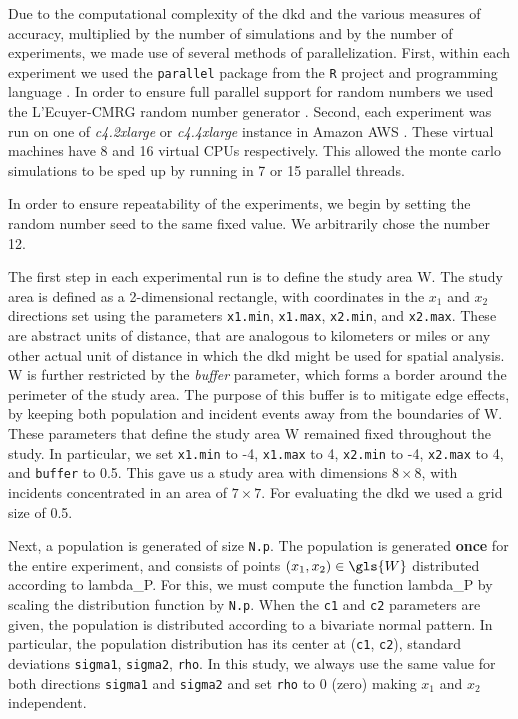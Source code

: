 Due to the computational complexity of the \gls{dkd} and the various measures of accuracy,
multiplied by the number of simulations and by the number of experiments,
we made use of several methods of parallelization.
First,
within each experiment we used the \texttt{parallel} package \citep{r:parallel}
from the \texttt{R} project and programming language \citep{r:project}.
In order to ensure full parallel support for random numbers we used the L'Ecuyer-CMRG random number generator \citep{lecuyer2002random}.
Second,
each experiment was run on one of \textit{c4.2xlarge} or \textit{c4.4xlarge} instance in Amazon AWS \citep{aws:instancetypes}.
These virtual machines have 8 and 16 virtual CPUs respectively.
This allowed the monte carlo simulations to be sped up by running in 7 or 15 parallel threads.

In order to ensure repeatability of the experiments, we begin by setting the random number seed to the same fixed value.
We arbitrarily chose the number 12.

The first step in each experimental run is to define the study area \gls{W}. 
The study area is defined as a 2-dimensional rectangle, with coordinates in the $x_1$ and $x_2$ directions set using the parameters \texttt{x1.min}, \texttt{x1.max}, \texttt{x2.min}, and \texttt{x2.max}.
These are abstract units of distance, that are analogous to kilometers or miles or any other actual unit of distance in which the \gls{dkd} might be used for spatial analysis.
\Gls{W} is further restricted by the \textit{buffer} parameter,
which forms a border around the perimeter of the study area.
The purpose of this buffer is to mitigate edge effects,
by keeping both population and incident events away from the boundaries of \gls{W}.
These parameters that define the study area \gls{W} remained fixed throughout the study.
In particular, we set \texttt{x1.min} to -4, \texttt{x1.max} to 4, \texttt{x2.min} to -4, \texttt{x2.max} to 4, and \texttt{buffer} to 0.5.
This gave us a study area with dimensions $8 \times 8$, with incidents concentrated in an area of $7 \times 7$.
For evaluating the \gls{dkd} we used a grid size of 0.5.

Next, a population is generated of size \texttt{N.p}.
The population is generated \textbf{once} for the entire experiment,
and consists of points $\xvec \in \gls{W}$ distributed according to \gls{lambda_P}.
For this,
we must compute the function \gls{lambda_P} by scaling the distribution function by \texttt{N.p}.
When the \texttt{c1} and \texttt{c2} parameters are given, the population is distributed according to a bivariate normal pattern.
In particular, the population distribution has its center at (\texttt{c1}, \texttt{c2}),
standard deviations \texttt{sigma1}, \texttt{sigma2}, \texttt{rho}.
In this study, we always use the same value for both directions \texttt{sigma1} and \texttt{sigma2} and set \texttt{rho} to 0 (zero) making $x_1$ and $x_2$ independent.

